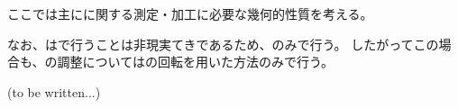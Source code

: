 

ここでは主に\textbf{\ReliefGroove}に関する測定・加工に必要な幾何的性質を考える。

なお、\ReliefGroove は\MMC で行うことは非現実てきであるため、\DMC のみで行う。
したがってこの場合も、\AlocationLength の調整については\Table の回転を用いた方法のみで行う。



\modHeadsection{\ReliefGroove\TBW}
(to be written...)



